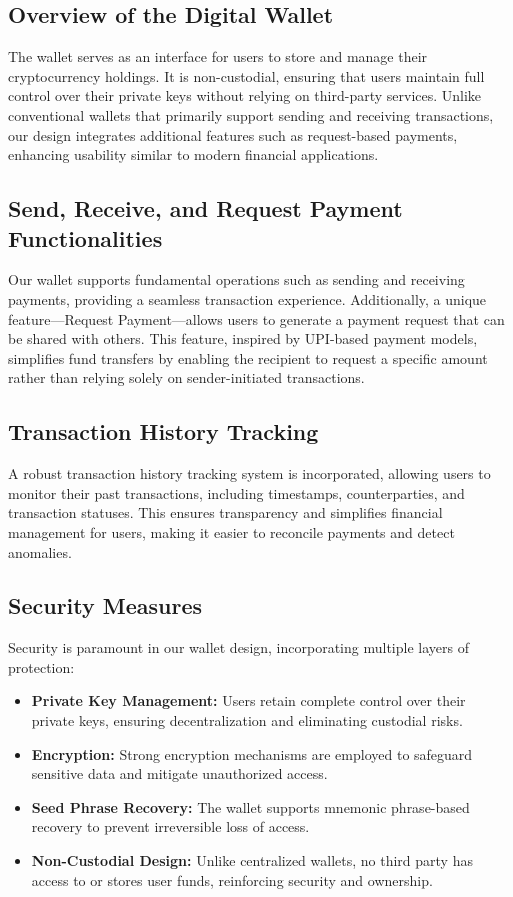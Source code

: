 \documentclass[conference]{IEEEtran}
\begin{document}
\subsection{Overview of the Digital Wallet}
The wallet serves as an interface for users to store and manage their cryptocurrency holdings. It is non-custodial, ensuring that users maintain full control over their private keys without relying on third-party services. Unlike conventional wallets that primarily support sending and receiving transactions, our design integrates additional features such as request-based payments, enhancing usability similar to modern financial applications.

\subsection{Send, Receive, and Request Payment Functionalities}
Our wallet supports fundamental operations such as sending and receiving payments, providing a seamless transaction experience. Additionally, a unique feature—Request Payment—allows users to generate a payment request that can be shared with others. This feature, inspired by UPI-based payment models, simplifies fund transfers by enabling the recipient to request a specific amount rather than relying solely on sender-initiated transactions.

\subsection{Transaction History Tracking}
A robust transaction history tracking system is incorporated, allowing users to monitor their past transactions, including timestamps, counterparties, and transaction statuses. This ensures transparency and simplifies financial management for users, making it easier to reconcile payments and detect anomalies.

\subsection{Security Measures}
Security is paramount in our wallet design, incorporating multiple layers of protection:
\begin{itemize}
    \item \textbf{Private Key Management:} Users retain complete control over their private keys, ensuring decentralization and eliminating custodial risks.
    \item \textbf{Encryption:} Strong encryption mechanisms are employed to safeguard sensitive data and mitigate unauthorized access.
    \item \textbf{Seed Phrase Recovery:} The wallet supports mnemonic phrase-based recovery to prevent irreversible loss of access.
    \item \textbf{Non-Custodial Design:} Unlike centralized wallets, no third party has access to or stores user funds, reinforcing security and ownership.
\end{itemize}
\end{document}

